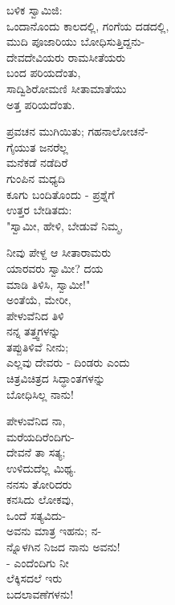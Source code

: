 \begin{myquote}
ಬಳಿಕ ಸ್ವಾಮಿಜಿ:\\ಒಂದಾನೊಂದು ಕಾಲದಲ್ಲಿ, ಗಂಗೆಯ ದಡದಲ್ಲಿ,\\ಮುದಿ ಪೂಜಾರಿಯು ಬೋಧಿಸುತ್ತಿದ್ದನು-\\ದೇವದೇವಿಯರು ರಾಮಸೀತೆಯರು\\ಬಂದ ಪರಿಯದೆಂತು,\\ಸಾದ್ವಿಶಿರೋಮಣಿ ಸೀತಾಮಾತೆಯು\\ಅತ್ತ ಪರಿಯದೆಂತು.
\end{myquote}

\begin{myquote}
ಪ್ರವಚನ ಮುಗಿಯಿತು; ಗಹನಾಲೋಚನೆ-\\ಗೈಯುತ ಜನರೆಲ್ಲ\\ಮನೆಕಡೆ ನಡೆದಿರೆ\\ಗುಂಪಿನ ಮಧ್ಯದಿ\\ಕೂಗು ಬಂದಿತೊಂದು - ಪ್ರಶ್ನೆಗೆ\\ಉತ್ತರ ಬೇಡಿತದು:\\"ಸ್ವಾಮೀ, ಹೇಳಿ, ಬೇಡುವೆ ನಿಮ್ಮ,
\end{myquote}

\begin{myquote}
ನೀವು ಪೇಳ್ದ ಆ ಸೀತಾರಾಮರು\\ಯಾರವರು ಸ್ವಾಮೀ? ದಯ\\ಮಾಡಿ ತಿಳಿಸಿ, ಸ್ವಾಮೀ!"\\ಅಂತೆಯೆ, ಮೇರೀ,\\ಪೇಳುವೆನಿದ ತಿಳಿ\\ನನ್ನ ತತ್ತ್ವಗಳನ್ನು\\ತಪ್ಪುತಿಳಿವೆ ನೀನು;\\ಎಲ್ಲವು ದೇವರು - ದಿಂಡರು ಎಂದು\\ಚಿತ್ರವಿಚಿತ್ರದ ಸಿದ್ಧಾಂತಗಳನ್ನು\\ಬೋಧಿಸಿಲ್ಲ ನಾನು!
\end{myquote}

\begin{myquote}
ಪೇಳುವೆನಿದ ನಾ,\\ಮರೆಯದಿರೆಂದಿಗು-\\ದೇವನೆ ತಾ ಸತ್ಯ;\\ಉಳಿದುದೆಲ್ಲ ಮಿಥ್ಯ.\\ನನಸು ತೋರಿದರು\\ಕನಸಿದು ಲೋಕವು,\\ಒಂದೆ ಸತ್ಯವಿದು-\\ಅವನು ಮಾತ್ರ ಇಹನು; ನ-\\ನ್ನೊಳಗಿನ ನಿಜದ ನಾನು ಅವನು!\\- ಎಂದೆಂದಿಗು ನೀ\\ಲೆಕ್ಕಿಸದಲೆ ಇರು\\ಬದಲಾವಣೆಗಳನು!
\end{myquote}

